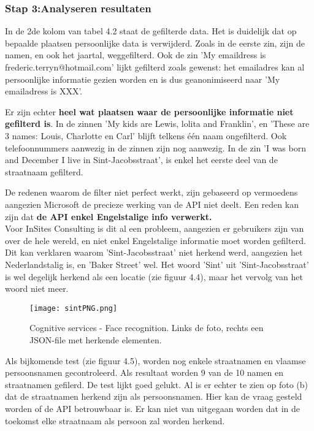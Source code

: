 \subsubsection{Stap 3:Analyseren resultaten}

In de 2de kolom van tabel 4.2 staat de gefilterde data. Het is duidelijk dat op bepaalde plaatsen persoonlijke data is verwijderd. Zoals in de eerste zin, zijn de namen, en ook het jaartal, weggefilterd. Ook de zin 'My emaildress is frederic.terryn@hotmail.com' lijkt gefilterd zoals gewenst: het emailadres kan al persoonlijke informatie gezien worden en is dus geanonimiseerd naar 'My emailadress is XXX'. 

Er zijn echter \textbf{heel wat plaatsen waar de persoonlijke informatie niet gefilterd is}. 
In de zinnen 'My kids are Lewis, lolita and Franklin', en 'These are 3 names: Louis, Charlotte en Carl' blijft telkens één naam ongefilterd. 
Ook telefoonnummers aanwezig in de zinnen zijn nog aanwezig. In de zin 'I was born and December I live in Sint-Jacobsstraat', is enkel het eerste deel van de straatnaam gefilterd.

De redenen waarom de filter niet perfect werkt, zijn gebaseerd op vermoedens aangezien Microsoft de precieze werking van de API niet deelt. Een reden kan zijn dat \textbf{de API enkel Engelstalige info verwerkt.} \\ Voor InSites Consulting is dit al een probleem, aangezien er gebruikers zijn van over de hele wereld, en niet enkel Engelstalige informatie moet worden gefilterd. 
Dit kan verklaren waarom 'Sint-Jacobsstraat' niet herkend werd, aangezien het Nederlandstalig is, en 'Baker Street' wel. 
Het woord 'Sint' uit 'Sint-Jacobsstraat' is wel degelijk herkend als een locatie (zie figuur 4.4), maar het vervolg van het woord niet meer. 
 
\begin{figure}[h]
    \texttt{[image: sintPNG.png]}
    \caption{Cognitive services - Face recognition. Links de foto, rechts een JSON-file met herkende elementen.}
    \label{fig:sint}
\end{figure}

Als bijkomende test (zie figuur 4.5), worden nog enkele straatnamen en vlaamse persoonsnamen gecontroleerd.
Als resultaat worden 9 van de 10 namen en straatnamen gefilerd. De test lijkt goed gelukt. Al is er echter te zien op foto (b) dat de straatnamen herkend zijn als persoonsnamen. Hier kan de vraag gesteld worden of de API betrouwbaar is. Er kan niet van uitgegaan worden dat in de toekomst elke straatnaam als persoon zal worden herkend. 

